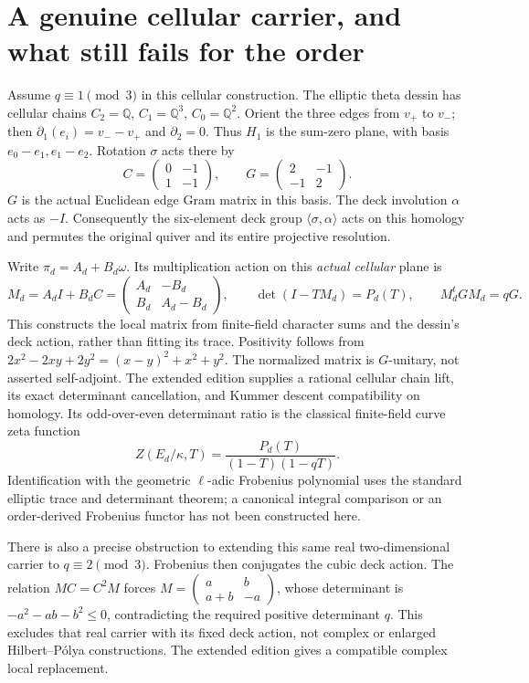 \section{A genuine cellular carrier, and what still fails for the order}
Assume $q\equiv1\pmod3$ in this cellular construction. The elliptic theta dessin has cellular chains $C_2=\mathbb{Q}$, $C_1=\mathbb{Q}^3$, $C_0=\mathbb{Q}^2$. Orient the three edges from $v_+$ to $v_-$; then $\partial_1(e_i)=v_--v_+$ and $\partial_2=0$. Thus $H_1$ is the sum-zero plane, with basis $e_0-e_1,e_1-e_2$. Rotation $\sigma$ acts there by
\[
 C=\begin{pmatrix}0&-1\\1&-1\end{pmatrix},\qquad
 G=\begin{pmatrix}2&-1\\-1&2\end{pmatrix}.
\]
$G$ is the actual Euclidean edge Gram matrix in this basis. The deck involution $\alpha$ acts as $-I$. Consequently the six-element deck group $\langle\sigma,\alpha\rangle$ acts on this homology and permutes the original quiver and its entire projective resolution.

Write $\pi_d=A_d+B_d\omega$. Its multiplication action on this \emph{actual cellular} plane is
\[
 M_d=A_dI+B_dC=\begin{pmatrix}A_d&-B_d\\B_d&A_d-B_d\end{pmatrix},\qquad
 \det(I-TM_d)=P_d(T),\qquad M_d^tGM_d=qG.
\]
This constructs the local matrix from finite-field character sums and the dessin's deck action, rather than fitting its trace. Positivity follows from $2x^2-2xy+2y^2=(x-y)^2+x^2+y^2$. The normalized matrix is $G$-unitary, not asserted self-adjoint. The extended edition supplies a rational cellular chain lift, its exact determinant cancellation, and Kummer descent compatibility on homology. Its odd-over-even determinant ratio is the classical finite-field curve zeta function
\[
 Z(E_d/\kappa,T)=\frac{P_d(T)}{(1-T)(1-qT)}.
\]
Identification with the geometric $\ell$-adic Frobenius polynomial uses the standard elliptic trace and determinant theorem; a canonical integral comparison or an order-derived Frobenius functor has not been constructed here.

There is also a precise obstruction to extending this same real two-dimensional carrier to $q\equiv2\pmod3$. Frobenius then conjugates the cubic deck action. The relation $MC=C^2M$ forces $M=\left(\begin{smallmatrix}a&b\\a+b&-a\end{smallmatrix}\right)$, whose determinant is $-a^2-ab-b^2\le0$, contradicting the required positive determinant $q$. This excludes that real carrier with its fixed deck action, not complex or enlarged Hilbert--P\'olya constructions. The extended edition gives a compatible complex local replacement.

